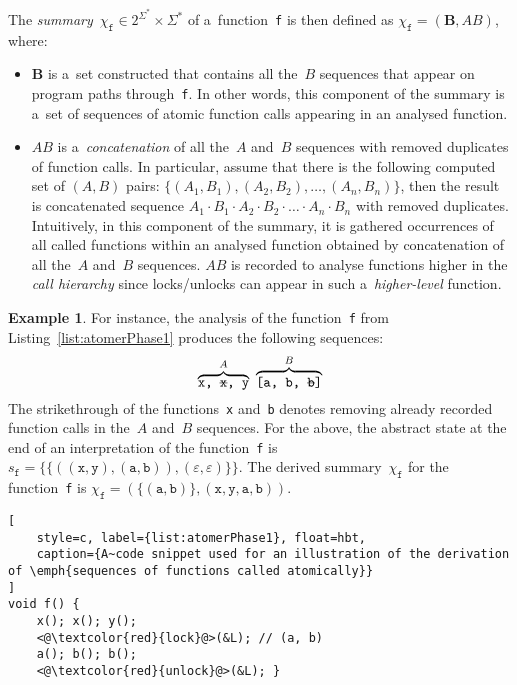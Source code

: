 \documentclass{ExcelAtFIT}
\theoremstyle{definition}
\newtheorem{example}{Example}[section]
\begin{document}
The \emph{summary}~$ \chi_\mathtt{f} \in 2^{\Sigma^*} \times \Sigma^* $ of a~function~\texttt{f} is then defined as $ \chi_\mathtt{f} = (\boldsymbol{B}, AB) $, where:
\begin{itemize}
    \item $ \boldsymbol{B} $ is a~set constructed that contains all the~$ B $ sequences that appear on program paths through~\texttt{f}. In other words, this component of the summary is a~set of sequences of atomic function calls appearing in an analysed function.

    \item $ AB $ is a~\emph{concatenation} of all the~$ A $ and~$ B $ sequences with removed duplicates of function calls. In particular, assume that there is the following computed set of ${ (A, B) }$ pairs: $ \{{(A_1, B_1)}, \allowbreak {(A_2, B_2)}, \ldots, {(A_n, B_n)}\} $, then the result is concatenated sequence $ A_1 \cdot B_1 \cdot A_2 \cdot B_2 \cdot \ldots \cdot A_n \cdot B_n $ with removed duplicates. Intuitively, in this component of the summary, it is gathered occurrences of all called functions within an analysed function obtained by concatenation of all the~$ A $ and~$ B $ sequences. $ AB $ is recorded to analyse functions higher in the \emph{call hierarchy} since locks/unlocks can appear in such a~\emph{higher-level} function.
\end{itemize}

\begin{example}
    For instance, the analysis of the function~\texttt{f} from Listing~\ref{list:atomerPhase1} produces the following sequences:
    $$
        \overbrace{\text{\texttt{x,~\sout{x},~y}}}^A~\overbrace{\text{\texttt{[a,~b,~\sout{b}]}}}^B
    $$
    The strikethrough of the functions~\texttt{x} and~\texttt{b} denotes removing already recorded function calls in the~$ A $ and~$ B $ sequences. For the above, the abstract state at the end of an interpretation of the function~\texttt{f} is $ s_\mathtt{f} = \{\{((\mathtt{x, y}), (\mathtt{a, b})), (\varepsilon, \varepsilon)\}\} $. The derived summary~$ \chi_\mathtt{f} $ for the function~\texttt{f} is $ \chi_\mathtt{f} = {(\{{(\mathtt{a, b})}\}, {(\mathtt{x, y, a, b})})} $.
\end{example}

\begin{lstlisting}[
    style=c, label={list:atomerPhase1}, float=hbt,
    caption={A~code snippet used for an illustration of the derivation of \emph{sequences of functions called atomically}}
]
void f() {
    x(); x(); y();
    <@\textcolor{red}{lock}@>(&L); // (a, b)
    a(); b(); b();
    <@\textcolor{red}{unlock}@>(&L); }
\end{lstlisting}
\end{document}
